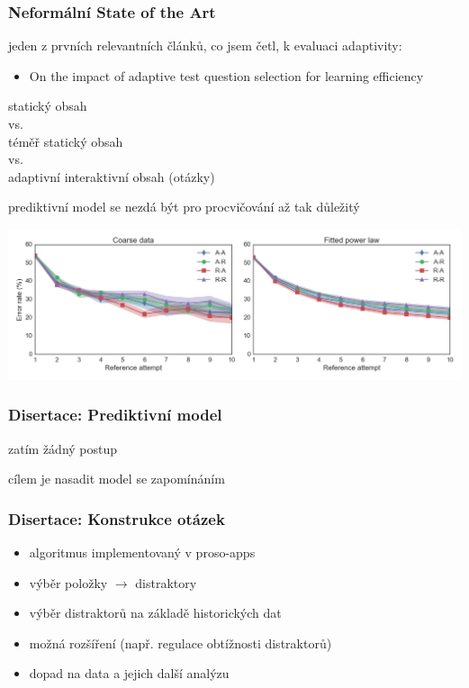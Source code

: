 \documentclass[xcolor=svgnames]{beamer}
\begin{document}
\begin{frame}
	\frametitle{Neformální State of the Art}
	jeden z prvních relevantních článků, co jsem četl, k evaluaci adaptivity:
	\begin{itemize}
		\item On the impact of adaptive test question selection for learning efficiency
	\end{itemize}
	\begin{center}
		statický obsah\\vs.\\téměř statický obsah\\vs.\\adaptivní interaktivní obsah (otázky)
	\end{center}
\end{frame}
\begin{frame}
\begin{center}
	prediktivní model se nezdá být pro procvičování až tak důležitý
\end{center}
\includegraphics[width=\textwidth]{figures/balanced_global_learning_raw}
\end{frame}
\begin{frame}
	\frametitle{Disertace: Prediktivní model}
	\begin{center}
		zatím žádný postup

		\bigskip
		cílem je nasadit model se zapomínáním
	\end{center}
\end{frame}
\begin{frame}
	\frametitle{Disertace: Konstrukce otázek}
	\begin{itemize}
		\item algoritmus implementovaný v proso-apps
		\item výběr položky $\rightarrow$ distraktory
		\item výběr distraktorů na základě historických dat
		\item možná rozšíření (např. regulace obtížnosti distraktorů)
		\item dopad na data a jejich další analýzu
	\end{itemize}
\end{frame}
\end{document}
